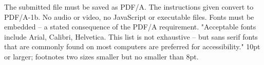 %
%




\thesisrequiretagging
{}
	{The submitted file must be saved as PDF/A. The instructions given convert
	 to PDF/A-1b. No audio or video, no JavaScript or executable files.}
	{Fonts must be embedded -- a stated consequence of the PDF/A requirement.}
	{"Acceptable fonts include Arial, Calibri, Helvetica. This list is not
	 exhaustive -- but sans serif fonts that are commonly found on most
	 computers are preferred for accessibility." 10pt or larger; footnotes two
	 sizes smaller but no smaller than 8pt.}

